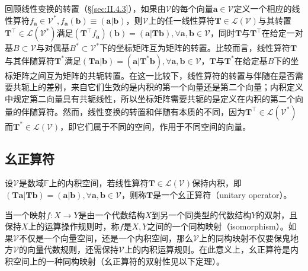 \documentclass[main.tex]{subfiles}
\begin{document}
回顾线性变换的转置（\S\ref{sec:II.4.3}），如果由$\mathcal{V}$的每个向量$\mathbf{a}\in\mathcal{V}$定义一个相应的线性算符$f_\mathbf{a}\in\mathcal{V}^*,f_\mathbf{a}\left(\mathbf{b}\right)\equiv\left(\mathbf{a}|\mathbf{b}\right)$，则$\mathcal{V}$上的任一线性算符$\mathbf{T}\in\mathcal{L}\left(\mathcal{V}\right)$与其转置$\mathbf{T}^\intercal\in\mathcal{L}\left(\mathcal{V}^*\right)$满足$\left(\mathbf{T}^\intercal f_\mathbf{a}\right)\left(\mathbf{b}\right)=\left(\mathbf{a}|\mathbf{Tb}\right),\forall\mathbf{a},\mathbf{b}\in\mathcal{V}$，同时$\mathbf{T}$与$\mathbf{T}^\intercal$在给定一对基$B\subset\mathcal{V}$与对偶基$B^*\subset\mathcal{V}^*$下的坐标矩阵互为矩阵的转置。比较而言，线性算符$\mathbf{T}$与其伴随算符$\mathbf{T}^*$满足$\left(\mathbf{Ta}|\mathbf{b}\right)=\left(\mathbf{a}|\mathbf{T}^*\mathbf{b}\right),\forall\mathbf{a},\mathbf{b}\in\mathcal{V}$，$\mathbf{T}$与$\mathbf{T}^*$在给定基$B$下的坐标矩阵之间互为矩阵的共轭转置。在这一比较下，线性算符的转置与伴随在是否需要共轭上的差别，来自它们生效的是内积的第一个向量还是第二个向量；内积定义中规定第二向量具有共轭线性，所以坐标矩阵需要共轭的是定义在内积的第二个向量的伴随算符。然而，线性变换的转置和伴随有本质的不同，因为$\mathbf{T}^\intercal\in\mathcal{L}\left(\mathcal{V}^*\right)$而$\mathbf{T}^*\in\mathcal{L}\left(\mathcal{V}\right)$，即它们属于不同的空间，作用于不同空间的向量。
                                           
\subsection{幺正算符}

\begin{definition}[幺正算符]\label{def:II.6.2}
设$\mathcal{V}$是数域$\mathbb{F}$上的内积空间，若线性算符$\mathbf{T}\in\mathcal{L}\left(\mathcal{V}\right)$保持内积，即$\left(\mathbf{Ta}|\mathbf{Tb}\right)=\left(\mathbf{a}|\mathbf{b}\right),\forall\mathbf{a},\mathbf{b}\in\mathcal{V}$，则称$\mathbf{T}$是一个幺正算符（unitary operator）。
\end{definition}

当一个映射$f:X\rightarrow Y$是由一个代数结构$X$到另一个同类型的代数结构$Y$的双射，且保持$X$上的运算操作规则时，称$f$是$X,Y$之间的一个同构映射（isomorphism）。如果$\mathcal{V}$不仅是一个向量空间，还是一个内积空间，那么$\mathcal{V}$上的同构映射不仅要保鬼地方$\mathcal{V}$的向量代数规则，还需保持$\mathcal{V}$上的内积运算规则。在此意义上，幺正算符是内积空间上的一种同构映射（幺正算符的双射性见以下定理）。
\end{document}
